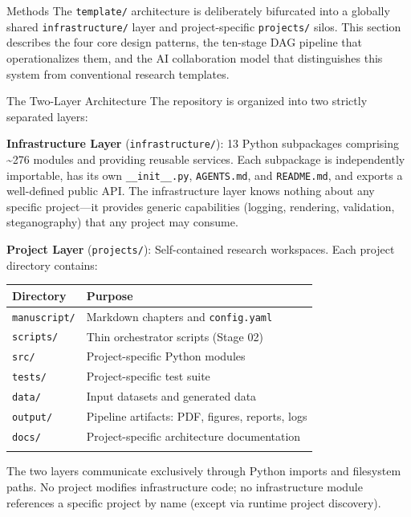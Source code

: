 \documentclass[
  ignorenonframetext,
]{beamer}
\author{\texorpdfstring{}{}}
\date{}
\newcounter{none} %
\begin{document}
\begin{frame}[fragile]{Methods}
\protect{}\label{methods}
The \texttt{template/} architecture is deliberately bifurcated into a
globally shared \texttt{infrastructure/} layer and project-specific
\texttt{projects/} silos. This section describes the four core design
patterns, the ten-stage DAG pipeline that operationalizes them, and the
AI collaboration model that distinguishes this system from conventional
research templates.

\begin{block}{The Two-Layer Architecture}
\protect{}\label{the-two-layer-architecture}
The repository is organized into two strictly separated layers:

\textbf{Infrastructure Layer} (\texttt{infrastructure/}): 13 Python
subpackages comprising \textasciitilde276 modules and providing reusable
services. Each subpackage is independently importable, has its own
\texttt{\_\_init\_\_.py}, \texttt{AGENTS.md}, and \texttt{README.md},
and exports a well-defined public API. The infrastructure layer knows
nothing about any specific project---it provides generic capabilities
(logging, rendering, validation, steganography) that any project may
consume.

\textbf{Project Layer} (\texttt{projects/}): Self-contained research
workspaces. Each project directory contains:

{\def\LTcaptype{none} %
\begin{longtable}[]{@{}ll@{}}
\toprule\noalign{}
Directory & Purpose \\
\midrule\noalign{}
\endhead
\texttt{manuscript/} & Markdown chapters and \texttt{config.yaml} \\
\texttt{scripts/} & Thin orchestrator scripts (Stage 02) \\
\texttt{src/} & Project-specific Python modules \\
\texttt{tests/} & Project-specific test suite \\
\texttt{data/} & Input datasets and generated data \\
\texttt{output/} & Pipeline artifacts: PDF, figures, reports, logs \\
\texttt{docs/} & Project-specific architecture documentation \\
\bottomrule\noalign{}
\end{longtable}
}

The two layers communicate exclusively through Python imports and
filesystem paths. No project modifies infrastructure code; no
infrastructure module references a specific project by name (except via
runtime project discovery).
\end{block}


\end{frame}
\end{document}
